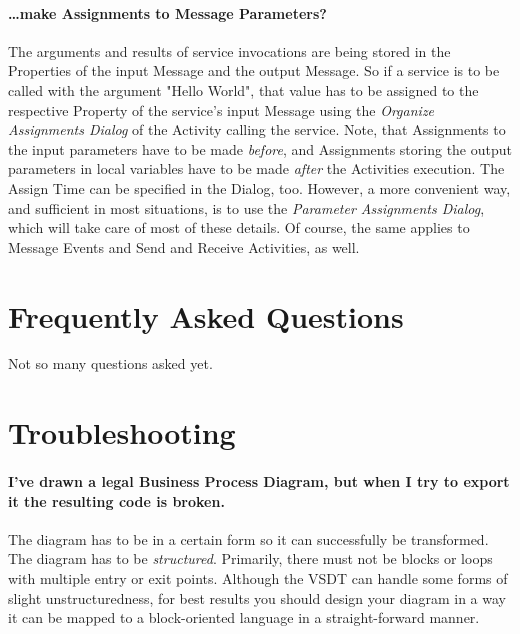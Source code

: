 \paragraph*{\dots make Assignments to Message Parameters?}
The arguments and results of service invocations are being stored in the Properties of the input Message and the output Message.  So if a service is to be called with the argument "Hello World", that value has to be assigned to the respective Property of the service's input Message using the \emph{Organize Assignments Dialog} of the Activity calling the service.  Note, that Assignments to the input parameters have to be made \emph{before}, and Assignments storing the output parameters in local variables have to be made \emph{after} the Activities execution.  The Assign Time can be specified in the Dialog, too.  However, a more convenient way, and sufficient in most situations, is to use the \emph{Parameter Assignments Dialog}, which will take care of most of these details.  Of course, the same applies to Message Events and Send and Receive Activities, as well.



\section{Frequently Asked Questions}
\label{sec:user_faq_faq}

Not so many questions asked yet.


\section{Troubleshooting}
\label{sec:user_faq_trouble}

\paragraph*{I've drawn a legal Business Process Diagram, but when I try to export it the resulting code is broken.}
The diagram has to be in a certain form so it can successfully be transformed. The diagram has to be \emph{structured}. Primarily, there must not be blocks or loops with multiple entry or exit points. Although the VSDT can handle some forms of slight unstructuredness, for best results you should design your diagram in a way it can be mapped to a block-oriented language in a straight-forward manner.

